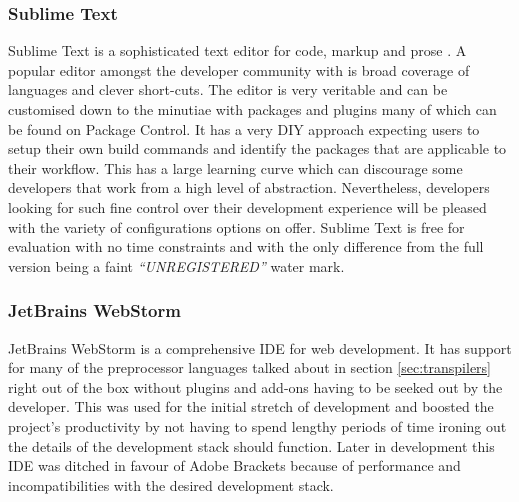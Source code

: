 \documentclass[final]{cmpreport}
\begin{document}

\subsubsection{Sublime Text}
Sublime Text is a sophisticated text editor for code, markup and prose \footnotemark. A popular editor amongst the developer community with is broad coverage of languages and clever short-cuts. The editor is very veritable and can be customised down to the minutiae with packages and plugins many of which can be found on Package Control\footnotemark. It has a very DIY approach expecting users to setup their own build commands and identify the packages that are applicable to their workflow. This has a large learning curve which can discourage some developers that work from a high level of abstraction. Nevertheless, developers looking for such fine control over their development experience will be pleased with the variety of configurations options on offer. Sublime Text is free for evaluation with no time constraints and with the only difference from the full version being a faint \textit{``UNREGISTERED''} water mark.


\subsubsection{JetBrains WebStorm}
JetBrains WebStorm is a comprehensive IDE for web development. It has support for many of the preprocessor languages talked about in section \ref{sec:transpilers} right out of the box without plugins and add-ons having to be seeked out by the developer. This was used for the initial stretch of development and boosted the project's productivity by not having to spend lengthy periods of time ironing out the details of the development stack should function. Later in development this IDE was ditched in favour of Adobe Brackets because of performance and incompatibilities with the desired development stack.
\end{document}
